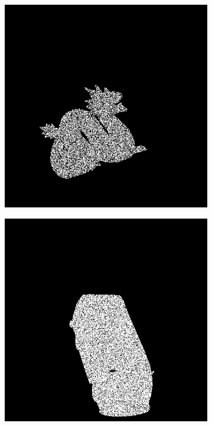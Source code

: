 \documentclass[border=15pt, multi, tikz]{article}
\begin{document}
\begin{figure}[H]
\begin{subfigure}[b]{0.18\linewidth}
\end{subfigure}
\begin{subfigure}[b]{0.18\linewidth}
	\includegraphics[width=\linewidth]{./Figures/test_scenes/05113.depth0_noise.png}
\end{subfigure}
\begin{subfigure}[b]{0.18\linewidth}
	\includegraphics[width=\linewidth]{./Figures/test_scenes/05126.depth0_noise.png}
\end{subfigure}


\end{figure}
\end{document}
